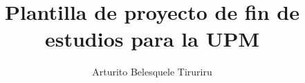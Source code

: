 \documentclass[%
    school=etsisi,%
    type=pfg,%
    degree=61TI,%
    authorsex=m,%
    directorsex=f,%
]{upm-report}
\author{Arturito Belesquele Tiruriru}
\title{Plantilla de proyecto de fin de estudios para la UPM}
\begin{document}


\frontmatter

\tableofcontents
\listoffigures
\listoftables
\lstlistoflistings

\mainmatter








\appendix





\backmatter

\printbibliography
\printglossaries
\printindex
\end{document}

